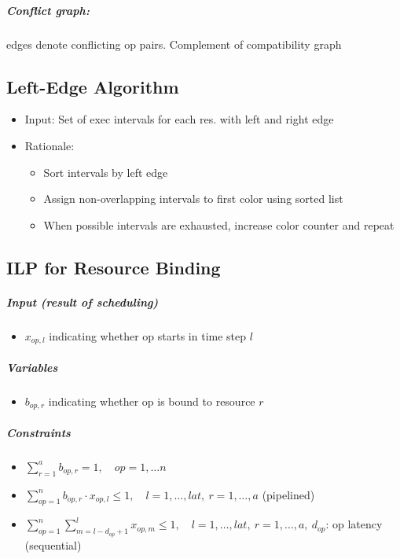 \documentclass[a4paper]{article}
\begin{document}
\subparagraph{Conflict graph:} edges denote conflicting op pairs. Complement of compatibility graph

\subsection{Left-Edge Algorithm}

\begin{itemize}
    \item Input: Set of exec intervals for each res. with left and right edge
    \item Rationale:
    \begin{itemize}
        \item Sort intervals by left edge
        \item Assign non-overlapping intervals to first color using sorted list
        \item When possible intervals are exhausted, increase color counter and repeat
    \end{itemize}
\end{itemize}

\subsection{ILP for Resource Binding}

\subparagraph{Input (result of scheduling)}
\begin{itemize}
    \item $x_{op, l}$ indicating whether op starts in time step $l$
\end{itemize}

\subparagraph{Variables}
\begin{itemize}
    \item $b_{op, r}$ indicating whether op is bound to resource $r$
\end{itemize}

\subparagraph{Constraints}
\begin{itemize}
    \item $\sum_{r=1}^a b_{op, r} = 1, \quad op = 1, \dots n$
    \item $\sum_{op = 1}^n b_{op, r} \cdot x_{op, l} \leq 1, \quad l = 1, \dots, lat, \ r = 1, \dots, a$ (pipelined)
    \item $\sum_{op = 1}^n \sum_{m = l - d_{op} + 1}^l x_{op, m} \leq 1, \quad l = 1, \dots, lat, \ r = 1, \dots, a, \ d_{op}$: op latency (sequential)
\end{itemize}
\end{document}
